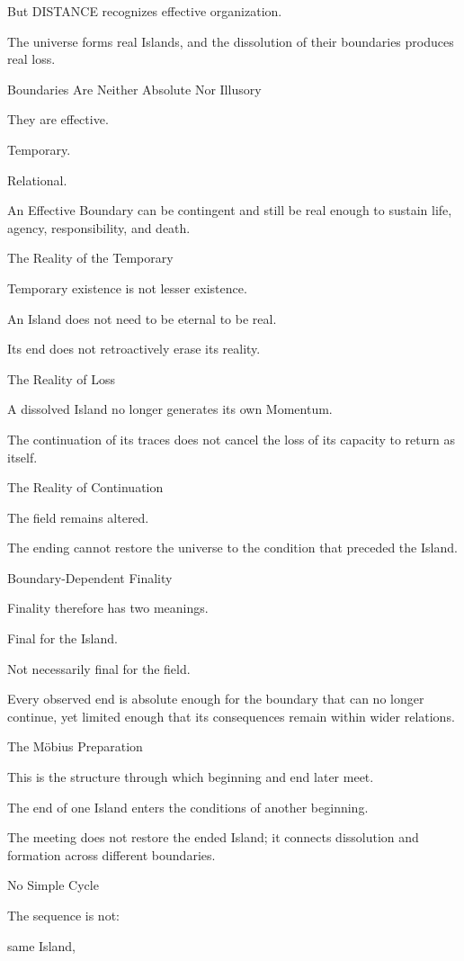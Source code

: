 But DISTANCE recognizes effective organization.

The universe forms real Islands, and the dissolution of their boundaries produces real loss.

Boundaries Are Neither Absolute Nor Illusory

They are effective.

Temporary.

Relational.

An Effective Boundary can be contingent and still be real enough to sustain life, agency, responsibility, and death.

The Reality of the Temporary

Temporary existence is not lesser existence.

An Island does not need to be eternal to be real.

Its end does not retroactively erase its reality.

The Reality of Loss

A dissolved Island no longer generates its own Momentum.

The continuation of its traces does not cancel the loss of its capacity to return as itself.

The Reality of Continuation

The field remains altered.

The ending cannot restore the universe to the condition that preceded the Island.

Boundary-Dependent Finality

Finality therefore has two meanings.

Final for the Island.

Not necessarily final for the field.

Every observed end is absolute enough for the boundary that can no longer continue, yet limited enough that its consequences remain within wider relations.

The Möbius Preparation

This is the structure through which beginning and end later meet.

The end of one Island enters the conditions of another beginning.

The meeting does not restore the ended Island; it connects dissolution and formation across different boundaries.

No Simple Cycle

The sequence is not:

same Island,

